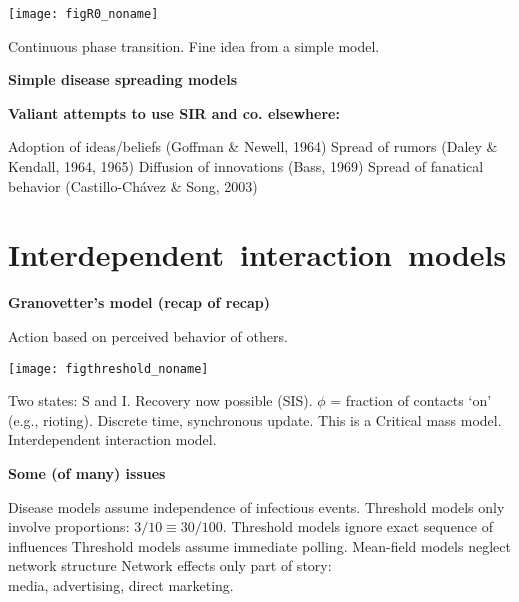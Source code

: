   \texttt{[image: figR0\_noname]}

  
   {Continuous phase transition.}
   {Fine idea from a simple model.}
  


  \textbf{Simple disease spreading models}

  \textbf{Valiant attempts to use SIR and co. elsewhere:}
    
     Adoption of ideas/beliefs (Goffman \& Newell, 1964)\cite{goffman1964a}
     Spread of rumors (Daley \& Kendall, 1964, 1965)\cite{daley1964a,daley1965a}
     Diffusion of innovations (Bass, 1969)\cite{bass1969a}
     Spread of fanatical behavior (Castillo-Ch\'{a}vez \& Song, 2003)%
    
  



\section{Interdependent\ interaction\ models}

  \textbf{Granovetter's model (recap of recap)}

  
   Action based on perceived behavior of others.
  

  \texttt{[image: figthreshold\_noname]}

  
   Two states: S and I.
   Recovery now possible (SIS).
   $\phi$ = fraction of contacts `on' (e.g., rioting).
   Discrete time, synchronous update.
   This is a \alert{Critical mass model}.
   \alert{Inter}dependent interaction model.
  


  \textbf{Some (of many) issues}

  
    
     Disease models assume independence of infectious events.
     Threshold models only involve proportions:
      $3/10 \equiv 30/100$.
     Threshold models ignore exact sequence of influences
     Threshold models assume immediate polling.
     Mean-field models neglect network structure
     Network effects only part of story: \\
      media, advertising, direct marketing.
    
  



%  
%  
%
%
